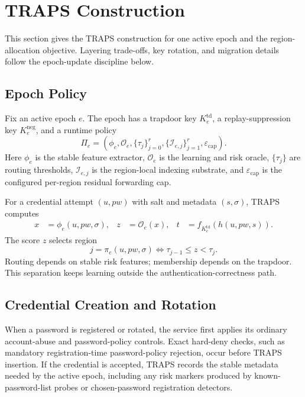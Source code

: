 \section{TRAPS Construction}
\label{sec:construction}

This section gives the TRAPS construction for one active epoch and the region-allocation objective. Layering trade-offs, key rotation, and migration details follow the epoch-update discipline below.

\subsection{Epoch Policy}

Fix an active epoch \(e\). The epoch has a trapdoor key \(K_e^{\mathrm{td}}\), a replay-suppression key \(K_e^{\mathrm{neg}}\), and a runtime policy
\[
\Pi_e
=
\left(
\phi_e,
\mathcal{O}_e,
\{\tau_j\}_{j=0}^{r},
\{\mathcal I_{e,j}\}_{j=1}^{r},
\varepsilon_{\mathrm{cap}}
\right).
\]
Here \(\phi_e\) is the stable feature extractor, \(\mathcal{O}_e\) is the learning and risk oracle, \(\{\tau_j\}\) are routing thresholds, \(\mathcal I_{e,j}\) is the region-local indexing substrate, and \(\varepsilon_{\mathrm{cap}}\) is the configured per-region residual forwarding cap.

For a credential attempt \((u,pw)\) with salt and metadata \((s,\sigma)\), TRAPS computes
\[
\begin{aligned}
x &= \phi_e(u,pw,\sigma), &
z &= \mathcal{O}_e(x), &
t &= f_{K_e^{\mathrm{td}}}(h(u,pw,s)).
\end{aligned}
\]
The score \(z\) selects region
\[
j=\pi_e(u,pw,\sigma)
\iff
\tau_{j-1}\le z<\tau_j.
\]
Routing depends on stable risk features; membership depends on the trapdoor. This separation keeps learning outside the authentication-correctness path.

\subsection{Credential Creation and Rotation}

When a password is registered or rotated, the service first applies its ordinary account-abuse and password-policy controls. Exact hard-deny checks, such as mandatory registration-time password-policy rejection, occur before TRAPS insertion. If the credential is accepted, TRAPS records the stable metadata needed by the active epoch, including any risk markers produced by known-password-list probes or chosen-password registration detectors.

